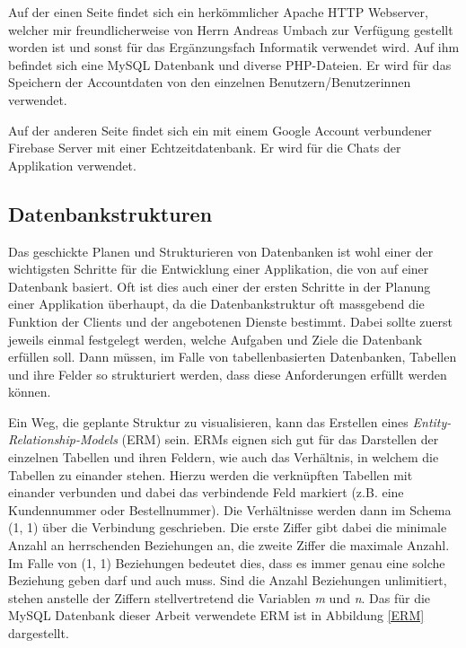 \documentclass[../main.tex]{subfiles}
\begin{document}
	Auf der einen Seite findet sich ein herkömmlicher Apache HTTP Webserver, welcher mir freundlicherweise von Herrn Andreas Umbach zur Verfügung gestellt worden ist und sonst für das Ergänzungsfach Informatik verwendet wird. Auf ihm befindet sich eine MySQL Datenbank und diverse PHP-Dateien. Er wird für das Speichern der Accountdaten von den einzelnen Benutzern/Benutzerinnen verwendet.
	
	Auf der anderen Seite findet sich ein mit einem Google Account verbundener Firebase Server mit einer Echtzeitdatenbank. Er wird für die Chats der Applikation verwendet.
	
	\subsection{Datenbankstrukturen}
	Das geschickte Planen und Strukturieren von Datenbanken ist wohl einer der wichtigsten Schritte für die Entwicklung einer Applikation, die von auf einer Datenbank basiert. Oft ist dies auch einer der ersten Schritte in der Planung einer Applikation überhaupt, da die Datenbankstruktur oft massgebend die Funktion der Clients und der angebotenen Dienste bestimmt. Dabei sollte zuerst jeweils einmal festgelegt werden, welche Aufgaben und Ziele die Datenbank erfüllen soll. Dann müssen, im Falle von tabellenbasierten Datenbanken, Tabellen und ihre Felder so strukturiert werden, dass diese Anforderungen erfüllt werden können. 
	
	Ein Weg, die geplante Struktur zu visualisieren, kann das Erstellen eines \emph{Entity-Relationship-Models} (ERM) sein. ERMs eignen sich gut für das Darstellen der einzelnen Tabellen und ihren Feldern, wie auch das Verhältnis, in welchem die Tabellen zu einander stehen. Hierzu werden die verknüpften Tabellen mit einander verbunden und dabei das verbindende Feld markiert (z.B. eine Kundennummer oder Bestellnummer). Die Verhältnisse werden dann im Schema (1, 1) über die Verbindung geschrieben. Die erste Ziffer gibt dabei die minimale Anzahl an herrschenden Beziehungen an, die zweite Ziffer die maximale Anzahl. Im Falle von (1, 1) Beziehungen bedeutet dies, dass es immer genau eine solche Beziehung geben darf und auch muss. Sind die Anzahl Beziehungen unlimitiert, stehen anstelle der Ziffern stellvertretend die Variablen \emph{m} und \emph{n}. Das für die MySQL Datenbank dieser Arbeit verwendete ERM ist in Abbildung \ref{ERM} dargestellt.
	
\end{document}
